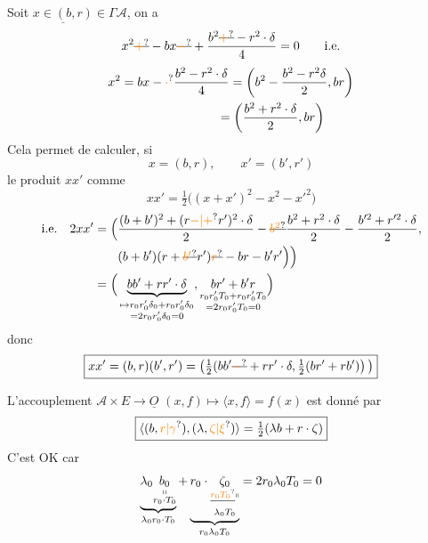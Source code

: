 Soit $\underline{x\in(b,r)}\in\Gamma\mathcal A$, on a
\[
x^2\deleted{\unsure{+}}-bx\deleted{\unsure{-}}+\frac{b^2\deleted{\unsure{+}}-r^2\cdot\delta}{4}=0\qquad\text{i.e.}
\]
\[
\begin{aligned}x^2&=bx-\unsure{\cdot}\frac{b^2-r^2\cdot\delta}{4}=\left(b^2-\frac{b^2-r^2\delta}{2},br\right)\\ &\phantom{=bx-\frac{b^2-r^2\cdot\delta}{4}}=\left(\frac{b^2+r^2\cdot\delta}{2},br\right)\end{aligned}
\]
Cela permet de calculer, si
\[
x=(b,r),\qquad x'=(b',r')
\]
le produit $xx'$ comme
\[
xx'=\tfrac12\big((x+x')^2-x^2-x'^2\big)
\]
\[
\begin{aligned}\text{i.e.}\quad 2xx'=\Big(&\frac{(b+b')^2+(r\unsure{-|+}r')^2\cdot\delta}{2}-\deleted{\unsure{b^2}}\frac{b^2+r^2\cdot\delta}{2}-\frac{b'^2+r'^2\cdot\delta}{2},\\ &(b+b')(r+\deleted{\unsure{b'}}r')\deleted{\unsure{r}}-br-b'r'\Big)\Big)\\ =\Big(&\underbrace{bb'+rr'\cdot\delta}_{\substack{\mapsto r_0r'_0\delta_0+r_0r'_0\delta_0\\=2r_0r'_0\delta_0=0}},\underset{\substack{r_0r'_0T_0+r_0r'_0T_0\\=2r_0r'_0T_0=0}}{br'+b'r}\Big)\end{aligned}
\]
donc
\[
\boxed{xx'=(b,r)(b',r')=\left(\tfrac12(bb'\deleted{\unsure{-}}+rr'\cdot\delta,\tfrac12(br'+rb')\right)\big)}
\]

L'accouplement $\mathcal A\times E\longrightarrow\underline O$ \quad $(x,f)\longmapsto\langle x,f\rangle=f(x)$ est donné par
\[
\boxed{\langle(b,\unsure{r|\gamma}),(\lambda,\unsure{\zeta|\xi})\rangle=\tfrac12(\lambda b+r\cdot\zeta)}
\]
C'est OK car
\[
\underbrace{\lambda_0\underset{\substack{\shortparallel\\r_0\cdot T_0}}{b_0}}_{\lambda_0r_0\cdot T_0}+\underbrace{r_0\cdot\underset{\substack{\deleted{\unsure{r_0T_0}}\shortparallel\\\lambda_0T_0}}{\zeta_0}}_{r_0\lambda_0T_0}=2r_0\lambda_0T_0=0
\]

